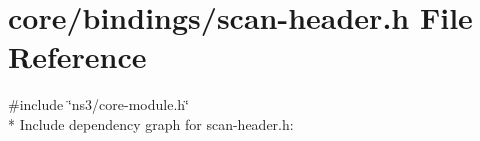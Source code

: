 \hypertarget{core_2bindings_2scan-header_8h}{}\section{core/bindings/scan-\/header.h File Reference}
\label{core_2bindings_2scan-header_8h}
{\ttfamily \#include \char`\"{}ns3/core-\/module.\+h\char`\"{}}\\*
Include dependency graph for scan-\/header.h\+:
